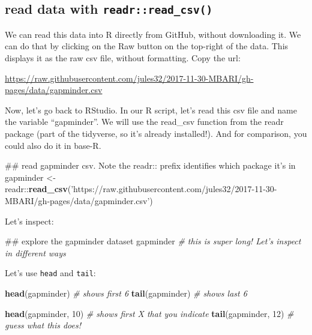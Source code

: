 \documentclass[]{book}
\newenvironment{Shaded}{\begin{snugshade}}{\end{snugshade}}
\newcommand{\KeywordTok}[1]{\textcolor[rgb]{0.13,0.29,0.53}{\textbf{{#1}}}}
\newcommand{\DecValTok}[1]{\textcolor[rgb]{0.00,0.00,0.81}{{#1}}}
\newcommand{\StringTok}[1]{\textcolor[rgb]{0.31,0.60,0.02}{{#1}}}
\newcommand{\CommentTok}[1]{\textcolor[rgb]{0.56,0.35,0.01}{\textit{{#1}}}}
\newcommand{\NormalTok}[1]{{#1}}
\theoremstyle{definition}
\theoremstyle{definition}
\theoremstyle{definition}
\theoremstyle{remark}
\begin{document}
\subsection{\texorpdfstring{read data with
\texttt{readr::read\_csv()}}{read data with readr::read\_csv()}}\label{read-data-with-readrread_csv}

We can read this data into R directly from GitHub, without downloading
it. We can do that by clicking on the Raw button on the top-right of the
data. This displays it as the raw csv file, without formatting. Copy the
url:

\url{https://raw.githubusercontent.com/jules32/2017-11-30-MBARI/gh-pages/data/gapminder.csv}

Now, let's go back to RStudio. In our R script, let's read this csv file
and name the variable ``gapminder''. We will use the read\_csv function
from the readr package (part of the tidyverse, so it's already
installed!). And for comparison, you could also do it in base-R.

\begin{Shaded}
\begin{Highlighting}[]
\NormalTok{## read gapminder csv. Note the readr:: prefix identifies which package it's in}
\NormalTok{gapminder <-}\StringTok{ }\NormalTok{readr::}\KeywordTok{read_csv}\NormalTok{(}\StringTok{'https://raw.githubusercontent.com/jules32/2017-11-30-MBARI/gh-pages/data/gapminder.csv'}\NormalTok{) }
\end{Highlighting}
\end{Shaded}

Let's inspect:

\begin{Shaded}
\begin{Highlighting}[]
\NormalTok{## explore the gapminder dataset}
\NormalTok{gapminder }\CommentTok{# this is super long! Let's inspect in different ways}
\end{Highlighting}
\end{Shaded}

Let's use \texttt{head} and \texttt{tail}:

\begin{Shaded}
\begin{Highlighting}[]
\KeywordTok{head}\NormalTok{(gapminder) }\CommentTok{# shows first 6}
\KeywordTok{tail}\NormalTok{(gapminder) }\CommentTok{# shows last 6}

\KeywordTok{head}\NormalTok{(gapminder, }\DecValTok{10}\NormalTok{) }\CommentTok{# shows first X that you indicate}
\KeywordTok{tail}\NormalTok{(gapminder, }\DecValTok{12}\NormalTok{) }\CommentTok{# guess what this does!}
\end{Highlighting}
\end{Shaded}
\end{document}
